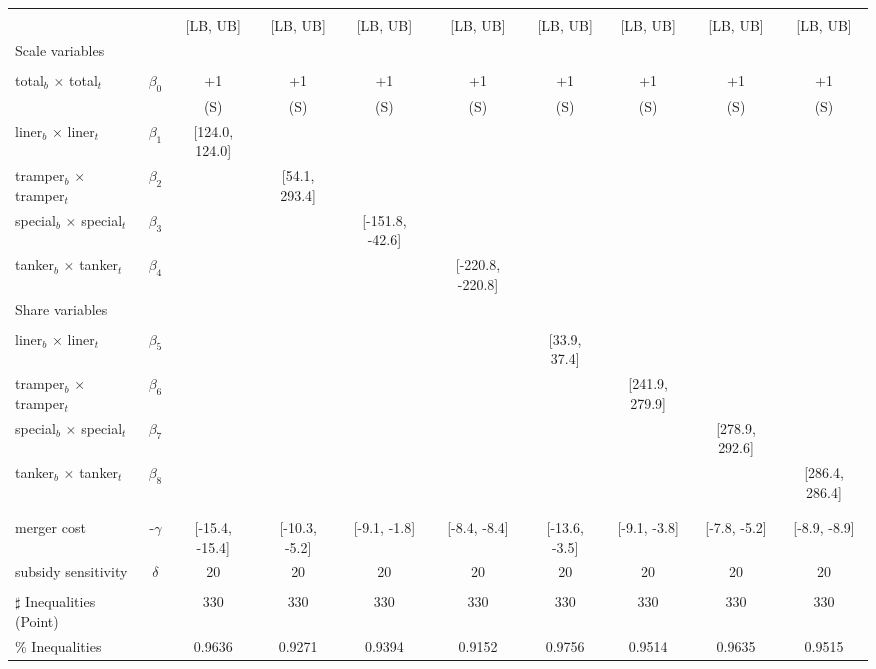 \begin{tabular}{@{\extracolsep{5pt}}lccccccccc}
\toprule 
 &  &  &  &  &  &  &  &  &  \\
 &  & [LB, UB] & [LB, UB] & [LB, UB] & [LB, UB] & [LB, UB] & [LB, UB] & [LB, UB] & [LB, UB] \\
\midrule 
Scale variables &  &  &  &  &  &  &  \\
 &  &  &  &  &  &  &  &  \\
total$_{b}$ $\times$ total$_{t}$ & $\beta_0$ & +1 & +1 & +1 & +1 & +1 & +1 & +1 & +1 \\
 &  & (S) & (S) & (S) & (S) & (S) & (S) & (S) & (S) \\
liner$_{b}$ $\times$ liner$_{t}$ & $\beta_1$ & [124.0, 124.0] &  &  &  &  &  &  &  \\
tramper$_{b}$ $\times$ tramper$_{t}$ & $\beta_2$ &  & [54.1, 293.4] &  &  &  &  &  &  \\
special$_{b}$ $\times$ special$_{t}$ & $\beta_3$ &  &  & [-151.8, -42.6] &  &  &  &  &  \\
tanker$_{b}$ $\times$ tanker$_{t}$ & $\beta_4$ &  &  &  & [-220.8, -220.8] &  &  &  &  \\
Share variables &  &  &  &  &  &  &  &  &  \\
 &  &  &  &  &  &  &  &  &  \\
liner$_{b}$ $\times$ liner$_{t}$ & $\beta_5$ &  &  &  &  & [33.9, 37.4] &  &  &  \\
tramper$_{b}$ $\times$ tramper$_{t}$ & $\beta_6$ &  &  &  &  &  & [241.9, 279.9] &  &  \\
special$_{b}$ $\times$ special$_{t}$ & $\beta_7$ &  &  &  &  &  &  & [278.9, 292.6] &  \\
tanker$_{b}$ $\times$ tanker$_{t}$ & $\beta_8$ &  &  &  &  &  &  &  & [286.4, 286.4] \\
 &  &  &  &  &  &  &  &  &  \\
 &  &  &  &  &  &  &  &  &  \\
merger cost & -$\gamma$ & [-15.4, -15.4] & [-10.3, -5.2] & [-9.1, -1.8] & [-8.4, -8.4] & [-13.6, -3.5] & [-9.1, -3.8] & [-7.8, -5.2] & [-8.9, -8.9] \\
subsidy sensitivity & $\delta$ & 20 & 20 & 20 & 20 & 20 & 20 & 20 & 20 \\
 &  &  &  &  &  &  &  &  &  \\
\hline 
$\sharp$ Inequalities (Point) &  & 330 & 330 & 330 & 330 & 330 & 330 & 330 & 330 \\
\% Inequalities &  & 0.9636 & 0.9271 & 0.9394 & 0.9152 & 0.9756 & 0.9514 & 0.9635 & 0.9515 \\
\bottomrule 
\end{tabular}
